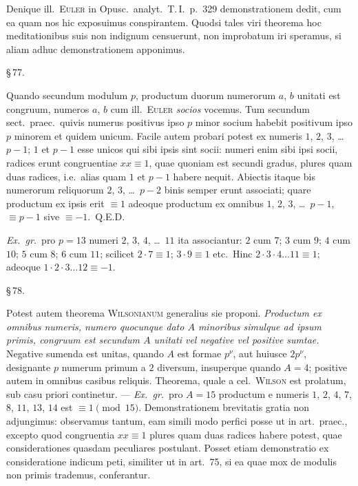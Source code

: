 \documentclass[12pt,a4paper]{article}
\theoremstyle{plain}
\theoremstyle{definition}
\theoremstyle{remark}
\begin{document}
Denique ill.\ \textsc{Euler} in Opusc.\ analyt.\ T.\,I.\ p.~329 demonstrationem dedit, cum ea quam nos hic exposuimus conspirantem. Quodsi tales viri theorema hoc meditationibus suis non indignum censuerunt, non improbatum iri speramus, si aliam adhuc demonstrationem apponimus.

\begin{center}\S\,77.\end{center}

Quando secundum modulum $p$, productum duorum numerorum $a$, $b$ unitati est congruum, numeros $a$, $b$ cum ill.\ \textsc{Euler} \emph{socios} vocemus. Tum secundum sect.\ praec.\ quivis numerus positivus ipso $p$ minor socium habebit positivum ipso $p$ minorem et quidem unicum. Facile autem probari potest ex numeris $1$, $2$, $3$, \dots\ $p-1$; $1$ et $p-1$ esse unicos qui sibi ipsis sint socii: numeri enim sibi ipsi socii, radices erunt congruentiae $xx \equiv 1$, quae quoniam est secundi gradus, plures quam duas radices, i.e.\ alias quam $1$ et $p-1$ habere nequit. Abiectis itaque bis numerorum reliquorum $2$, $3$, \dots\ $p-2$ binis semper erunt associati; quare productum ex ipsis erit $\equiv 1$ adeoque productum ex omnibus $1$, $2$, $3$, \dots\ $p-1$, $\equiv p-1$ sive $\equiv -1$.\ Q.E.D.

\textit{Ex.\ gr.}\ pro $p = 13$ numeri $2$, $3$, $4$, \dots\ $11$ ita associantur: $2$ cum $7$; $3$ cum $9$; $4$ cum $10$; $5$ cum $8$; $6$ cum $11$; scilicet $2 \cdot 7 \equiv 1$; $3 \cdot 9 \equiv 1$ etc.\ Hinc $2 \cdot 3 \cdot 4 \dots 11 \equiv 1$; adeoque $1 \cdot 2 \cdot 3 \dots 12 \equiv -1$.

\begin{center}\S\,78.\end{center}

Potest autem theorema \textsc{Wilsonianum} generalius sie proponi. \emph{Productum ex omnibus numeris, numero quocunque dato $A$ minoribus simulque ad ipsum primis, congruum est secundum $A$ unitati vel negative vel positive sumtae.} Negative sumenda est unitas, quando $A$ est formae $p^\nu$, aut huiusce $2p^\nu$, designante $p$ numerum primum a $2$ diversum, insuperque quando $A = 4$; positive autem in omnibus casibus reliquis. Theorema, quale a cel.\ \textsc{Wilson} est prolatum, sub casu priori continetur. --- \textit{Ex.\ gr.}\ pro $A = 15$ productum e numeris $1$, $2$, $4$, $7$, $8$, $11$, $13$, $14$ est $\equiv 1 \pmod{15}$. Demonstrationem brevitatis gratia non adjungimus: observamus tantum, eam simili modo perfici posse ut in art.\ praec., excepto quod congruentia $xx \equiv 1$ plures quam duas radices habere potest, quae considerationes quasdam peculiares postulant. Posset etiam demonstratio ex consideratione indicum peti, similiter ut in art.~75, si ea quae mox de modulis non primis trademus, conferantur.
\end{document}
